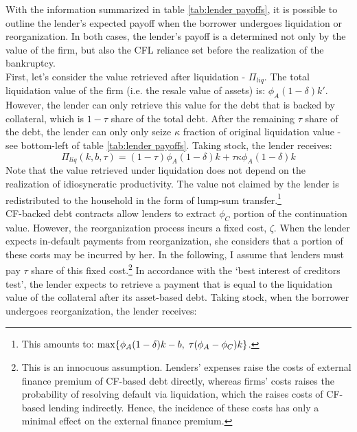 \documentclass[12pt]{article}
\begin{document}
\noindent With the information summarized in table \ref{tab:lender payoffs}, it is possible to outline the lender's expected payoff when the borrower undergoes liquidation or reorganization. In both cases, the lender's payoff is a determined not only by the value of the firm, but also the CFL reliance set before the realization of the bankruptcy. \vspace{3mm} \\
 First, let's consider the value retrieved after liquidation - $\Pi_{liq}$. The total liquidation value of the firm (i.e. the resale value of assets) is: $\phi_A (1-\delta) k'$. However, the lender can only retrieve this value for the  debt that is backed by collateral, which is $1-\tau$ share of the total debt. After the remaining $\tau$ share of the debt, the lender can only only seize $\kappa$ fraction of original liquidation value - see bottom-left of table \ref{tab:lender payoffs}. Taking stock, the lender receives:
\begin{equation} \label{eq:P_liq} 
   \Pi_{liq}(k,b,\tau) = (1-\tau) \phi_A (1-\delta) k +\tau \kappa \phi_A  (1-\delta) k
\end{equation}
Note that the value retrieved under liquidation does not depend on the realization of idiosyncratic productivity. The value not claimed by the lender is redistributed to the household in the form of lump-sum transfer.\footnote{This amounts to: $ \max \{\phi_A (1-\delta) k - b, \hspace{1mm} \tau (\phi_A-\phi_C) k  \} $.} \vspace{3mm} \\
CF-backed debt contracts allow lenders to extract $\phi_C$ portion of the continuation value. However, the reorganization process incurs a fixed cost, $\zeta$. When the lender expects in-default payments from reorganization, she considers that a portion of these costs may be incurred by her. In the following, I assume that lenders must pay $\tau$ share of this fixed cost.\footnote{This is an innocuous assumption. Lenders' expenses raise the costs of external finance premium of CF-based debt directly, whereas firms' costs raises the probability of resolving default via liquidation, which the raises costs of CF-based lending indirectly. Hence, the incidence of these costs has only a minimal effect on the external finance premium.} In accordance with the `best interest of creditors test', the lender expects to retrieve a payment that is equal to the liquidation value of the collateral after its asset-based debt. Taking stock, when the borrower undergoes reorganization, the lender receives:
\end{document}
